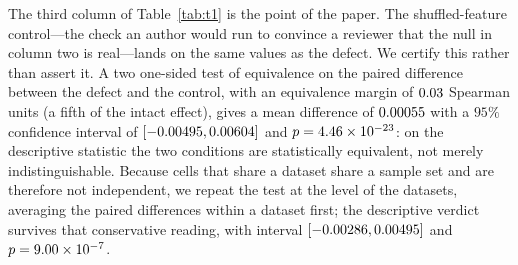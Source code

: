 \documentclass[a4paper,fleqn]{cas-sc}
\begin{document}
The third column of Table~\ref{tab:t1} is the point of the paper. The
shuffled-feature control---the check an author would run to convince a reviewer
that the null in column two is real---lands on the same values as the defect.
We certify this rather than assert it. A two one-sided test of equivalence
\citep{schuirmann1987,lakens2017} on the paired difference between the defect and
the control, with an equivalence margin of $0.03{}$ Spearman units
(a fifth of the intact effect), gives a mean difference of
$0.00055{}$ with a $95\%$ confidence interval of
$[-0.00495{}, 0.00604{}]$ and $p = 4.46\times 10^{-23}{}$:
on the descriptive statistic the two conditions are statistically equivalent, not
merely indistinguishable. Because cells that share a dataset share a sample set and
are therefore not independent, we repeat the test at the level of the
\NumTaskOneTostClusters{} datasets, averaging the paired differences within a
dataset first; the descriptive verdict survives that conservative reading, with
interval $[-0.00286{}, 0.00495{}]$ and
$p = 9.00\times 10^{-7}{}$.
\end{document}
